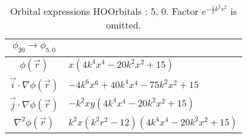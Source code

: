 \begin{table}
\begin{center}
\begin{tabular}{c|l}
$\phi_{20} \rightarrow \phi_{5, 0}$\\
\hline
$\phi(\vec r)$ & $x \left(4 k^{4} x^{4} - 20 k^{2} x^{2} + 15\right)$\\
\hline
$\vec i\cdot \nabla \phi(\vec r)$ & $- 4 k^{6} x^{6} + 40 k^{4} x^{4} - 75 k^{2} x^{2} + 15$\\
$\vec j\cdot \nabla \phi(\vec r)$ & $- k^{2} x y \left(4 k^{4} x^{4} - 20 k^{2} x^{2} + 15\right)$\\
\hline
$\nabla^2 \phi(\vec r)$ & $k^{2} x \left(k^{2} r^{2} -12\right) \left(4 k^{4} x^{4} - 20 k^{2} x^{2} + 15\right)$\\
\end{tabular}
\caption{Orbital expressions HOOrbitals : 5, 0. Factor $e^{- \frac{1}{2} k^{2} r^{2}}$ is omitted.}
\end{center}
\end{table}



% 

